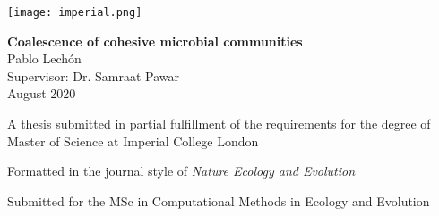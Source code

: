 \documentclass[titlepage,11pt]{article}
\newlength\longest\clearpage
\begin{document}
	\begin{titlepage}
		\texttt{[image: imperial.png]} 
		\vspace*{\fill}
		\begin{center}
			\hfill \break
			\hfill \break
			{\LARGE \textbf{Coalescence of cohesive microbial communities}}\\
			\hfill \break
			\hfill \break
			Pablo Lechón\\
			Supervisor: Dr. Samraat Pawar\\
			August 2020\\
		\end{center}
		\vspace*{\fill}
		
		\begin{center}
			A thesis submitted in partial fulfillment of the requirements for the degree of Master of Science at Imperial College London
			
			Formatted in the journal style of \textit{Nature Ecology and Evolution}
			
			Submitted for the MSc in Computational Methods in Ecology and Evolution
		\end{center}
	\end{titlepage}

	
	\clearpage
	
	\thispagestyle{empty}
	\null\vfill
	
	\settowidth{}
	\begin{center}
	\parbox{\longest}{%
		\raggedright{%
			\par\bigskip
		}   
		\par%
	}
\end{center}
	\vfill\vfill
	
	\clearpage
	
\end{document}
